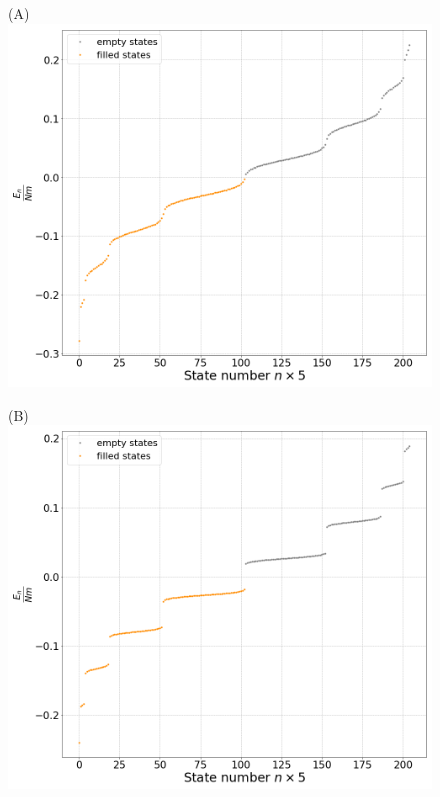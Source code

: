 \begin{figure}[htb]
	\begin{minipage}{.5\textwidth}
		\centering(A)
		\includegraphics[scale=0.18]{figures/FreeFullSpec_m2.png}
	\end{minipage}%
	\begin{minipage}{0.5\textwidth}
		\centering(B)
		\includegraphics[scale=0.18]{figures/FreeFullSpec_m4.png}
	\end{minipage}
	\begin{minipage}{.5\textwidth}

\end{minipage}
\end{figure}
